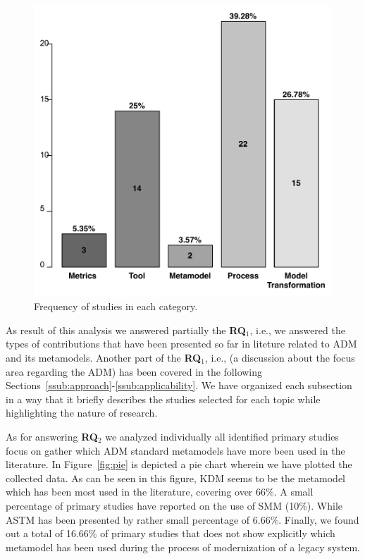 \begin{figure}[!h]
 \centering
  \includegraphics[scale=0.35]{figuras/NovoBarFormated}
 \caption{Frequency of studies in each category.}
 \label{fig:bar}
 \end{figure} 

 As result of this analysis we answered partially the \textbf{RQ$_1$}, i.e., we answered the types of contributions that have been presented so far in liteture related to ADM and its metamodels. Another part of the \textbf{RQ$_1$}, i.e., (a discussion about the focus area regarding the ADM) has been covered in the following Sections~\ref{ssub:approach}-\ref{ssub:applicability}. We have organized each subsection in a way that it briefly describes the studies selected for each topic while highlighting the nature of research.

As for answering \textbf{RQ$_2$} we analyzed individually all identified primary studies focus on gather which ADM standard metamodels have more been used in the literature.  In Figure~\ref{fig:pie} is depicted a pie chart wherein we have plotted the collected data. As can be seen in this figure, KDM seems to be the metamodel which has been most used in the literature, covering over 66\%. A small percentage of primary studies have reported on the use of SMM (10\%). While ASTM has been presented by rather small percentage of 6.66\%. Finally, we found out a total of 16.66\% of primary studies that does not show explicitly which metamodel has been used during the process of modernization of a legacy system. 

